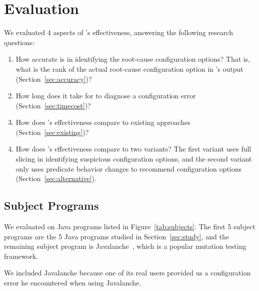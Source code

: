 
\section{Evaluation}
\label{sec:evaluation}

We evaluated 4 aspects of \ourtool's effectiveness, answering
the following research questions:

\vspace{-2mm}

\begin{enumerate}
\item How accurate is \ourtool in identifying the root-cause
configuration options? That is, what is the rank of the
actual root-cause configuration option in \ourtool's output (Section~\ref{sec:accuracy})?

\item How long does it take for \ourtool to diagnose
a configuration error (Section~\ref{sec:timecost})?

\item How does \ourtool's effectiveness compare to
existing approaches (Section~\ref{sec:existing})?

\item How does \ourtool's effectiveness compare to
two variants? The first variant
uses full slicing in identifying
suspicious configuration options, and the second 
variant only uses predicate behavior
changes to recommend configuration options (Section~\ref{sec:alternative}).

\end{enumerate}

\subsection{Subject Programs}

We evaluated \ourtool on \subjnum Java programs
listed in Figure~\ref{tab:subjects}.
The first 5 subject programs are the 5 Java programs
studied in Section~\ref{sec:study},
and the remaining subject program is Javalanche~\cite{javalanche},
which is a popular mutation testing framework.

We included Javalanche because one of its real users
provided us a configuration error he encountered when using Javalanche.

\newcommand{\randoopoptnum}{57\xspace}
\newcommand{\wekaoptnum}{14\xspace}
\newcommand{\synopticoptnum}{37\xspace}
\newcommand{\jchordoptnum}{79\xspace}
\newcommand{\jmeteroptnum}{55\xspace}
\newcommand{\javalancheoptnum}{35\xspace}

